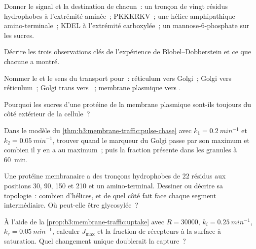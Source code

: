 \begin{exercise}[$\star$]\label{exo:b3:membrane-traffic:1}
Donner le signal et la destination de chacun~: un tronçon de vingt
résidus hydrophobes à l'extrémité aminée~; PKKKRKV~; une hélice
amphipathique amino-terminale~; KDEL à l'extrémité carboxylée~; un
mannose-6-phosphate sur les sucres.
\end{exercise}

\begin{exercise}[$\star$]\label{exo:b3:membrane-traffic:2}
Décrire les trois observations clés de l'expérience de
Blobel--Dobberstein et ce que chacune a montré.
\end{exercise}

\begin{exercise}[$\star$]\label{exo:b3:membrane-traffic:3}
Nommer le  et le sens du transport pour~: réticulum vers Golgi~;
Golgi vers réticulum~; Golgi trans vers ~; membrane plasmique
vers .
\end{exercise}

\begin{exercise}[$\star$]\label{exo:b3:membrane-traffic:4}
Pourquoi les sucres d'une protéine de la membrane plasmique sont-ils
toujours du côté extérieur de la cellule~?
\end{exercise}

\begin{exercise}[$\star\star$]\label{exo:b3:membrane-traffic:5}
Dans le modèle du \cref{thm:b3:membrane-traffic:pulse-chase} avec $k_{1}
= \qty{0.2}{min^{-1}}$ et $k_{2} = \qty{0.05}{min^{-1}}$, trouver quand
le marqueur du Golgi passe par son maximum et combien il y en a au
maximum~; puis la fraction présente dans les granules à \qty{60}{min}.
\end{exercise}

\begin{exercise}[$\star\star$]\label{exo:b3:membrane-traffic:6}
Une protéine membranaire a des tronçons hydrophobes de $22$ résidus aux
positions 30, 90, 150 et 210 et un  amino-terminal.
Dessiner ou décrire sa topologie~: combien d'hélices, et de quel côté
fait face chaque segment intermédiaire. Où peut-elle être glycosylée~?
\end{exercise}

\begin{exercise}[$\star\star$]\label{exo:b3:membrane-traffic:7}
À l'aide de la \cref{prop:b3:membrane-traffic:uptake} avec
$R = \num{30000}$, $k_{i} = \qty{0.25}{min^{-1}}$,
$k_{r} = \qty{0.05}{min^{-1}}$, calculer $J_{\max}$ et la fraction de
récepteurs à la surface à saturation. Quel changement unique
doublerait la capture~?
\end{exercise}


